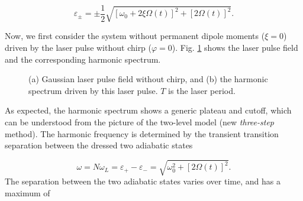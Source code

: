 \documentclass[10pt,letterpaper]{article}
\begin{document}
\begin{equation}
{\varepsilon _ \pm } =  \pm \frac{1}{2}\sqrt {{{\left[ {{\omega _0} + 2\xi \Omega \left( t \right)} \right]}^2} + {{\left[ {2\Omega \left( t \right)} \right]}^2}}.
\label{eq15}
\end{equation}

Now, we first consider the system without permanent dipole moments ($ \xi=0 $) driven by the laser pulse without chirp ($ \varphi=0 $). Fig. \ref{fig1} shows the laser pulse field and the corresponding harmonic spectrum.

\begin{figure}[!htbp]
	\centering
	\caption{(a) Gaussian laser pulse field without chirp, and (b) the harmonic spectrum driven by this laser pulse. $T$ is the laser period.}
	\label{fig1}
\end{figure}

As expected, the harmonic spectrum shows a generic plateau and cutoff, which can be understood from the picture of the two-level model (new \emph{three-step} method). The harmonic frequency is determined by the transient transition separation between the dressed two adiabatic states

\begin{equation}
\omega  = N{\omega _L} = {\varepsilon _ + } - {\varepsilon _ - } = \sqrt {\omega _0^2 + {{\left[ {2\Omega \left( t \right)} \right]}^2}} .
\label{eq16}
\end{equation}
The separation between the two adiabatic states varies over time, and has a maximum of 
\end{document}
